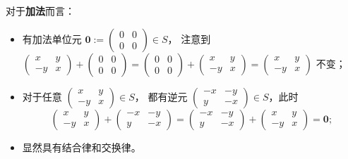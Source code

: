 \begin{question}
\begin{solution}
对于\textbf{加法}而言：
\begin{itemize}
  \item 有加法单位元 \(\mathbf{0}:=\begin{pmatrix}0&0\\0&0\end{pmatrix}\in S\)，
  注意到 \(\begin{pmatrix}x&y\\-y&x\end{pmatrix}+\begin{pmatrix}0&0\\0&0\end{pmatrix}
  =\begin{pmatrix}0&0\\0&0\end{pmatrix}+\begin{pmatrix}x&y\\-y&x\end{pmatrix}
  =\begin{pmatrix}x&y\\-y&x\end{pmatrix}\) 不变；
  \item 对于任意 \(\begin{pmatrix}x&y\\-y&x\end{pmatrix}\in S\)，
  都有逆元 \(\begin{pmatrix}-x&-y\\y&-x\end{pmatrix}\in S\)，此时
  \[
  \begin{pmatrix}x&y\\-y&x\end{pmatrix}+\begin{pmatrix}-x&-y\\y&-x\end{pmatrix}
  =\begin{pmatrix}-x&-y\\y&-x\end{pmatrix}+\begin{pmatrix}x&y\\-y&x\end{pmatrix}
  =\mathbf{0};
  \]
  \item 显然具有结合律和交换律。
\end{itemize}


\end{solution}
\end{question}
